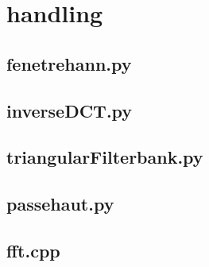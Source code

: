 \chapter{handling}
	\section{fenetrehann.py}
	
	
	\section{inverseDCT.py}
	
	
	\section{triangularFilterbank.py}
	
	
	\section{passehaut.py}
	
	
	\section{fft.cpp}
	